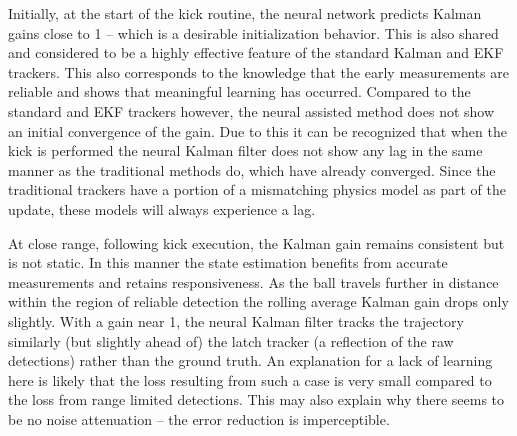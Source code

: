 \documentclass[a4paper,twoside,12pt]{report}
\begin{document}


Initially, at the start of the kick routine, the neural network predicts Kalman gains close to 1 -- which is a desirable initialization behavior. This is also shared and considered to be a highly effective feature of the standard Kalman and EKF trackers. This also corresponds to the knowledge that the early measurements are reliable and shows that meaningful learning has occurred. Compared to the standard and EKF trackers however, the neural assisted method does not show an initial convergence of the gain. Due to this it can be recognized that when the kick is performed the neural Kalman filter does not show any lag in the same manner as the traditional methods do, which have already converged. Since the traditional trackers have a portion of a mismatching physics model as part of the update, these models will always experience a lag.

At close range, following kick execution, the Kalman gain remains consistent but is not static. In this manner the state estimation benefits from accurate measurements and retains responsiveness. As the ball travels further in distance within the region of reliable detection the rolling average Kalman gain drops only slightly. With a gain near 1, the neural Kalman filter tracks the trajectory similarly (but slightly ahead of) the latch tracker (a reflection of the raw detections) rather than the ground truth. An explanation for a lack of learning here is likely that the loss resulting from such a case is very small compared to the loss from range limited detections. This may also explain why there seems to be no noise attenuation -- the error reduction is imperceptible.
\end{document}
